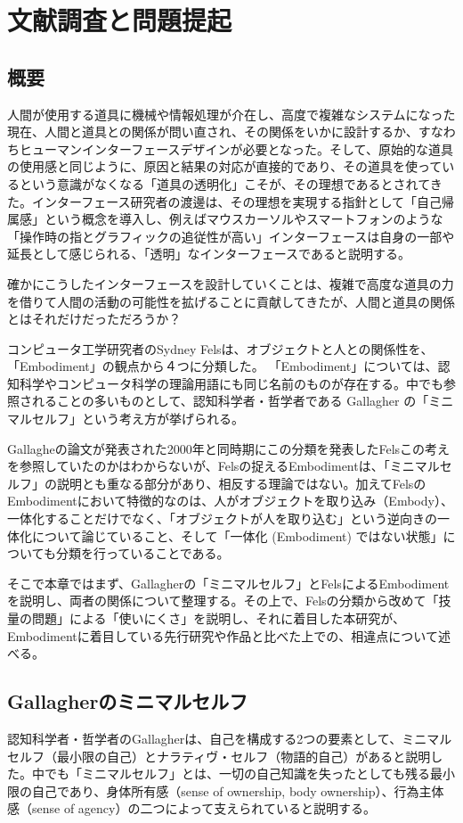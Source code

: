 \chapter{文献調査と問題提起}
\label{related_works}
\section{概要}
人間が使用する道具に機械や情報処理が介在し、高度で複雑なシステムになった現在、人間と道具との関係が問い直され、その関係をいかに設計するか、すなわちヒューマンインターフェースデザインが必要となった。そして、原始的な道具の使用感と同じように、原因と結果の対応が直接的であり、その道具を使っているという意識がなくなる「道具の透明化」こそが、その理想であるとされてきた\cite{Watanabe2017}。インターフェース研究者の渡邊は、その理想を実現する指針として「自己帰属感」という概念を導入し、例えばマウスカーソルやスマートフォンのような「操作時の指とグラフィックの追従性が高い」インターフェースは自身の一部や延長として感じられる、「透明」なインターフェースであると説明する。

確かにこうしたインターフェースを設計していくことは、複雑で高度な道具の力を借りて人間の活動の可能性を拡げることに貢献してきたが、人間と道具の関係とはそれだけだっただろうか？

コンピュータ工学研究者のSydney Felsは、オブジェクトと人との関係性を、「Embodiment」の観点から４つに分類した\cite{Fels}。
「Embodiment」については、認知科学やコンピュータ科学の理論用語にも同じ名前のものが存在する。中でも参照されることの多いものとして、認知科学者・哲学者である Gallagher\cite{Gallagher2000} の「ミニマルセルフ」という考え方が挙げられる。

Gallagheの論文が発表された2000年と同時期にこの分類を発表したFelsこの考えを参照していたのかはわからないが、Felsの捉えるEmbodimentは、「ミニマルセルフ」の説明とも重なる部分があり、相反する理論ではない。加えてFelsのEmbodimentにおいて特徴的なのは、人がオブジェクトを取り込み（Embody）、一体化することだけでなく、「オブジェクトが人を取り込む」という逆向きの一体化について論じていること、そして「一体化 (Embodiment) ではない状態」についても分類を行っていることである。

そこで本章ではまず、Gallagherの「ミニマルセルフ」とFelsによるEmbodimentを説明し、両者の関係について整理する。その上で、Felsの分類から改めて「技量の問題」による「使いにくさ」を説明し、それに着目した本研究が、Embodimentに着目している先行研究や作品と比べた上での、相違点について述べる。

\section{Gallagherのミニマルセルフ}
認知科学者・哲学者のGallagher\cite{Gallagher2000}は、自己を構成する2つの要素として、ミニマルセルフ（最小限の自己）とナラティヴ・セルフ（物語的自己）があると説明した。中でも「ミニマルセルフ」とは、一切の自己知識を失ったとしても残る最小限の自己であり、身体所有感（sense of ownership, body ownership）、行為主体感（sense of agency）の二つによって支えられていると説明する。


